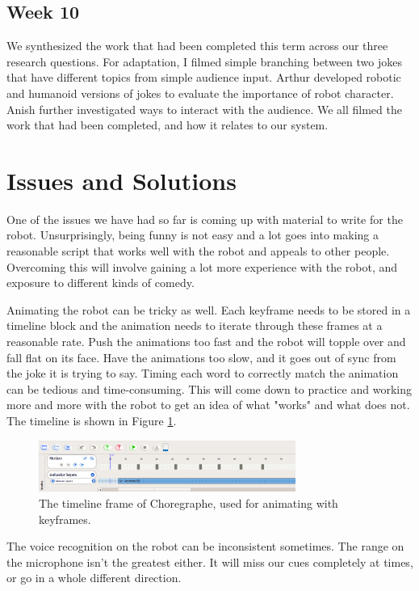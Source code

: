 \documentclass[onecolumn, draftclsnofoot,10pt, compsoc]{IEEEtran}
\begin{document}
\subsection{Week 10}
	We synthesized the work that had been completed this term across our three research questions. For adaptation, I filmed simple branching between two jokes that have different topics from simple audience input. Arthur developed robotic and humanoid versions of jokes to evaluate the importance of robot character. Anish further investigated ways to interact with the audience. We all filmed the work that had been completed, and how it relates to our system.
	
\section{Issues and Solutions}
One of the issues we have had so far is coming up with material to write for the robot. Unsurprisingly, being funny is not easy and a lot goes into making a reasonable script that works well with the robot and appeals to other people. Overcoming this will involve gaining a lot more experience with the robot, and exposure to different kinds of comedy.

Animating the robot can be tricky as well. Each keyframe needs to be stored in a timeline block and the animation needs to iterate through these frames at a reasonable rate. Push the animations too fast and the robot will topple over and fall flat on its face. Have the animations too slow, and it goes out of sync from the joke it is trying to say. Timing each word to correctly match the animation can be tedious and time-consuming. This will come down to practice and working more and more with the robot to get an idea of what "works" and what does not. The timeline is shown in Figure \ref{fig:timeline}.

\begin{figure}[H]
  \centering
  \includegraphics[width=0.75\textwidth,height=0.75\textheight,keepaspectratio]{timeline}
  \caption{The timeline frame of Choregraphe, used for animating with keyframes.}
	\label{fig:timeline}
\end{figure}

The voice recognition on the robot can be inconsistent sometimes. The range on the microphone isn't the greatest either. It will miss our cues completely at times, or go in a whole different direction.
\end{document}
